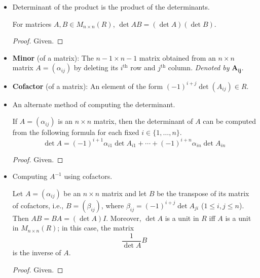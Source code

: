 \documentclass[../notes.tex]{subfiles}
\begin{document}
\begin{itemize}
    \item Determinant of the product is the product of the determinants.
    \begin{theorem}\label{trm:11.28}
        For matrices $A,B\in M_{n\times n}(R)$, $\det AB=(\det A)(\det B)$.
        \begin{proof}
            Given.
        \end{proof}
    \end{theorem}
    \item \textbf{Minor} (of a matrix): The $n-1\times n-1$ matrix obtained from an $n\times n$ matrix $A=(\alpha_{ij})$ by deleting its $i^\text{th}$ row and $j^\text{th}$ column. \emph{Denoted by} $\bm{A_{ij}}$.
    \item \textbf{Cofactor} (of a matrix): An element of the form $(-1)^{i+j}\det(A_{ij})\in R$.
    \item An alternate method of computing the determinant.
    \begin{theorem}\label{trm:11.29}
        If $A=(\alpha_{ij})$ is an $n\times n$ matrix, then the determinant of $A$ can be computed from the following formula for each fixed $i\in\{1,\dots,n\}$.
        \begin{equation*}
            \det A = (-1)^{i+1}\alpha_{i1}\det A_{i1}+\cdots+(-1)^{i+n}\alpha_{in}\det A_{in}
        \end{equation*}
        \begin{proof}
            Given.
        \end{proof}
    \end{theorem}
    \item Computing $A^{-1}$ using cofactors.
    \begin{theorem}\label{trm:11.30}
        Let $A=(\alpha_{ij})$ be an $n\times n$ matrix and let $B$ be the transpose of its matrix of cofactors, i.e., $B=(\beta_{ij})$, where $\beta_{ij}=(-1)^{i+j}\det A_{ji}$ ($1\leq i,j\leq n$). Then $AB=BA=(\det A)I$. Moreover, $\det A$ is a unit in $R$ iff $A$ is a unit in $M_{n\times n}(R)$; in this case, the matrix
        \begin{equation*}
            \frac{1}{\det A}B
        \end{equation*}
        is the inverse of $A$.
        \begin{proof}
            Given.
        \end{proof}
    \end{theorem}
\end{itemize}
\end{document}
